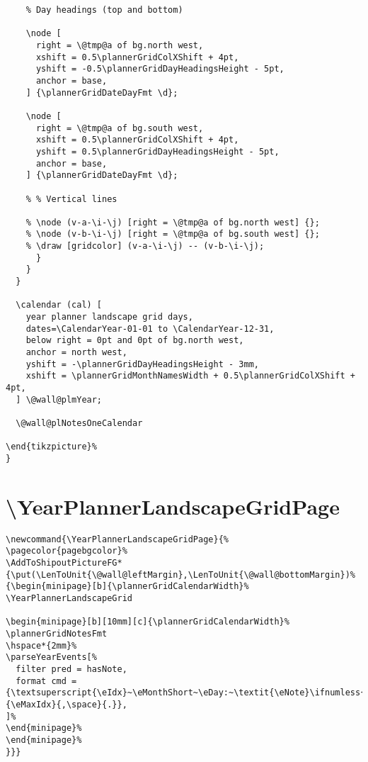 \documentclass[11pt,oneside]{memoir-article}
\begin{document}
\begin{verbatim}
	% Day headings (top and bottom)

	\node [
	  right = \@tmp@a of bg.north west,
	  xshift = 0.5\plannerGridColXShift + 4pt,
	  yshift = -0.5\plannerGridDayHeadingsHeight - 5pt,
	  anchor = base,
	] {\plannerGridDateDayFmt \d};

	\node [
	  right = \@tmp@a of bg.south west,
	  xshift = 0.5\plannerGridColXShift + 4pt,
	  yshift = 0.5\plannerGridDayHeadingsHeight - 5pt,
	  anchor = base,
	] {\plannerGridDateDayFmt \d};

	% % Vertical lines

	% \node (v-a-\i-\j) [right = \@tmp@a of bg.north west] {};
	% \node (v-b-\i-\j) [right = \@tmp@a of bg.south west] {};
	% \draw [gridcolor] (v-a-\i-\j) -- (v-b-\i-\j);
      }
    }
  }

  \calendar (cal) [
    year planner landscape grid days,
    dates=\CalendarYear-01-01 to \CalendarYear-12-31,
    below right = 0pt and 0pt of bg.north west,
    anchor = north west,
    yshift = -\plannerGridDayHeadingsHeight - 3mm,
    xshift = \plannerGridMonthNamesWidth + 0.5\plannerGridColXShift + 4pt,
  ] \@wall@plmYear;

  \@wall@plNotesOneCalendar

\end{tikzpicture}%
}
\end{verbatim}

\section{\textbackslash YearPlannerLandscapeGridPage}
\label{sec:orgbb8cea3}

\begin{verbatim}
\newcommand{\YearPlannerLandscapeGridPage}{%
\pagecolor{pagebgcolor}%
\AddToShipoutPictureFG*{\put(\LenToUnit{\@wall@leftMargin},\LenToUnit{\@wall@bottomMargin})%
{\begin{minipage}[b]{\plannerGridCalendarWidth}%
\YearPlannerLandscapeGrid

\begin{minipage}[b][10mm][c]{\plannerGridCalendarWidth}%
\plannerGridNotesFmt
\hspace*{2mm}%
\parseYearEvents[%
  filter pred = hasNote,
  format cmd = {\textsuperscript{\eIdx}~\eMonthShort~\eDay:~\textit{\eNote}\ifnumless{\eIdx}{\eMaxIdx}{,\space}{.}},
]%
\end{minipage}%
\end{minipage}%
}}}
\end{verbatim}
\end{document}
